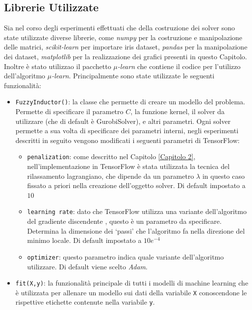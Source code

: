 \documentclass[a4paper,12pt]{report}
\begin{document}
\subsection*{Librerie Utilizzate}
Sia nel corso degli esperimenti effettuati che della costruzione dei solver sono state utilizzate diverse librerie, come \textit{numpy} \cite{NumPy} per la costruzione e manipolazione delle matrici, \textit{scikit-learn} \cite{scikit-learn} per importare iris dataset, \textit{pandas} \cite{pandas} per la manipolazione dei dataset, \textit{matplotlib} \cite{matplotlib} per la realizzazione dei grafici presenti in questo Capitolo. Inoltre è stato utilizzao il pacchetto \textit{$\mu$-learn} \cite{mulearn_documentation} che contiene il codice per l'utilizzo dell'algoritmo \textit{$\mu$-learn}. Principalmente sono state utilizzate le seguenti funzionalità:
\begin{itemize}
    \item \texttt{FuzzyInductor()}: la classe che permette di creare un modello del problema. Permette di specificare il parametro $C$, la funzione kernel, il solver da utilizzare (che di default è GurobiSolver), e altri parametri. Ogni solver permette a sua volta di specificare dei parametri interni, negli esperimenti descritti in seguito vengono modificati i seguenti parametri di TensorFlow:
    \begin{itemize}
        \item \texttt{penalization}: come descritto nel Capitolo \ref{Capitolo 2}, nell'implementazione in TensorFlow è stata utilizzata la tecnica del rilassamento lagrangiano, che dipende da un parametro $\lambda$ in questo caso fissato a priori nella creazione dell'oggetto solver. Di default impostato a $10$
        \item \texttt{learning rate}: dato che TensorFlow utilizza una variante dell'algoritmo del gradiente discendente \cite{gradient_descent}, questo è un parametro da specificare. Determina la dimensione dei `passi' che l'algoritmo fa nella direzione del minimo locale. Di default impostato a $10e^{-4}$
        \item \texttt{optimizer}: questo parametro indica quale variante dell'algoritmo utilizzare. Di default viene scelto \textit{Adam}.
    \end{itemize}
    \item \texttt{fit(X,y)}: la funzionalità principale di tutti i modelli di machine learning che è utilizzata per allenare un modello sui dati della variabile \texttt{X} conoscendone le rispettive etichette contenute nella variabile \texttt{y}.

\end{itemize}
\end{document}
